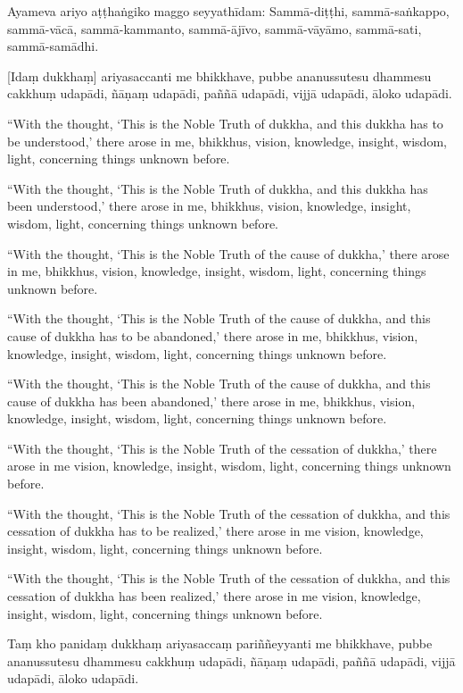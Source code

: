 Ayameva ariyo aṭṭhaṅgiko maggo seyyathīdam: Sammā-diṭṭhi,
sammā-saṅkappo, sammā-vācā, sammā-kammanto, sammā-ājīvo, sammā-vāyāmo,
sammā-sati, sammā-samādhi.

[Idaṃ dukkhaṃ] ariyasaccanti me bhikkhave, pubbe ananussutesu dhammesu
cakkhuṃ udapādi, ñāṇaṃ udapādi, paññā udapādi, vijjā udapādi, āloko
udapādi.

\clearpage

\englishText

``With the thought, `This is the Noble Truth of dukkha, and this dukkha
has to be understood,' there arose in me, bhikkhus, vision, knowledge,
insight, wisdom, light, concerning things unknown before.

``With the thought, `This is the Noble Truth of dukkha, and this dukkha
has been understood,' there arose in me, bhikkhus, vision, knowledge,
insight, wisdom, light, concerning things unknown before.

``With the thought, `This is the Noble Truth of the cause of dukkha,'
there arose in me, bhikkhus, vision, knowledge, insight, wisdom, light,
concerning things unknown before.

``With the thought, `This is the Noble Truth of the cause of dukkha, and
this cause of dukkha has to be abandoned,' there arose in me, bhikkhus,
vision, knowledge, insight, wisdom, light, concerning things unknown
before.

``With the thought, `This is the Noble Truth of the cause of dukkha, and
this cause of dukkha has been abandoned,' there arose in me, bhikkhus,
vision, knowledge, insight, wisdom, light, concerning things unknown
before.

``With the thought, `This is the Noble Truth of the cessation of
dukkha,' there arose in me vision, knowledge, insight, wisdom, light,
concerning things unknown before.

``With the thought, `This is the Noble Truth of the cessation of dukkha,
and this cessation of dukkha has to be realized,' there arose in me
vision, knowledge, insight, wisdom, light, concerning things unknown
before.

``With the thought, `This is the Noble Truth of the cessation of dukkha,
and this cessation of dukkha has been realized,' there arose in me
vision, knowledge, insight, wisdom, light, concerning things unknown
before.

\clearpage

\paliText

Taṃ kho panidaṃ dukkhaṃ ariyasaccaṃ pariññeyyanti me bhikkhave, pubbe
ananussutesu dhammesu cakkhuṃ udapādi, ñāṇaṃ udapādi, paññā udapādi,
vijjā udapādi, āloko udapādi.

